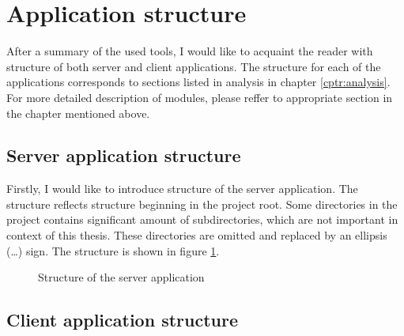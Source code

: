 \section{Application structure}\label{sec:application-structure}

After a summary of the used tools, I would like to acquaint the reader with structure of both server and client applications.
The structure for each of the applications corresponds to sections listed in analysis in chapter \ref{cptr:analysis}.
For more detailed description of modules, please reffer to appropriate section in the chapter mentioned above.

\subsection{Server application structure}

Firstly, I would like to introduce structure of the server application.
The structure reflects structure beginning in the project root.
Some directories in the project contains significant amount of subdirectories, which are not important in context of this thesis.
These directories are omitted and replaced by an ellipsis (\dots) sign.
The structure is shown in figure \ref{fig:server-structure}.

\begin{figure}[H]
    \caption{Structure of the server application}\label{fig:server-structure}
\end{figure}

\subsection{Client application structure}

